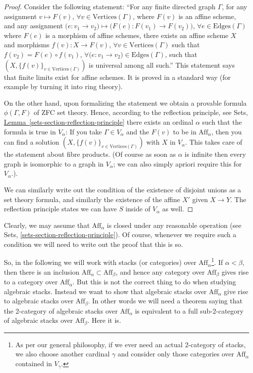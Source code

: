 \begin{proof}
Consider the following statement: ``For any finite directed graph $\Gamma$,
for any assignment $v \mapsto F(v)$, $\forall v\in \text{Vertices}(\Gamma)$,
where $F(v)$ is an affine scheme, and any assignment
$\big(e : v_1 \to v_2\big) \mapsto \big(F(e) : F(v_1) \to F(v_2)\big)$,
$\forall e \in \text{Edges}(\Gamma)$ where $F(e)$ is a morphism of affine
schemes, there exists an affine scheme $X$ and morphisms $f(v) : X \to F(v)$,
$\forall v\in \text{Vertices}(\Gamma)$ such that $f(v_2) = F(e) \circ f(v_1)$,
$\forall \big(e : v_1 \to v_2\big) \in \text{Edges}(\Gamma)$, such that
$(X, \{f(v)\}_{v\in \text{Vertices}(\Gamma)})$ is universal among all such.''
This statement says that finite limits exist for affine schemes. It is
proved in a standard way (for example by turning it into ring theory).

\smallskip\noindent
On the other hand, upon formalizing the statement we obtain a provable
formula $\phi(\Gamma, F)$ of ZFC set theory. Hence, according to the reflection
principle, see Sets, \hyperref[sets-section-reflection-principle]%
{Lemma~\ref*{sets-section-reflection-principle}}
there exists an ordinal $\alpha$ such that the formula is true in
$V_\alpha$: If you take $\Gamma \in V_\alpha$ and the $F(v)$ to be in
$\text{Aff}_\alpha$, then you can find a solution
$(X, \{f(v)\}_{v\in \text{Vertices}(\Gamma)})$
with $X$ in $V_\alpha$. This takes care of the statement about fibre 
products. (Of course as soon as $\alpha$ is infinite then every
graph is isomorphic to a graph in $V_\alpha$; we can also simply apriori
require this for $V_\alpha$.).

\smallskip\noindent
We can similarly write out the condition of the existence of disjoint unions
as a set theory formula, and similarly the existence of the affine $X'$
given $X \to Y$. The reflection principle states we can have $S$ inside of
$V_\alpha$ as well.
\end{proof}

\noindent
Clearly, we may assume that $\text{Aff}_\alpha$ is closed under any reasonable
operation (see Sets, \autoref{sets-section-reflection-principle}).
Of course, whenever we require such a condition we will need to write out
the proof that this is so.

\smallskip\noindent
So, in the following we will work with stacks (or categories) over
$\text{Aff}_\alpha$\footnote{As per our general philosophy, if we ever need
an actual 2-category of stacks, we also choose another cardinal $\gamma$ and
consider only those categories over $\text{Aff}_\alpha$ contained in
$V_\gamma$.}. If $\alpha < \beta$, then there is an inclusion
$\text{Aff}_\alpha \subset \text{Aff}_\beta$, and hence any category
over $\text{Aff}_\beta$ gives rise to a category over $\text{Aff}_\alpha$.
But this is not the correct thing to do when studying algebraic stacks.
Instead we want to show that algebraic stacks over $\text{Aff}_\alpha$
give rise to algebraic stacks over $\text{Aff}_\beta$. In other words we will
need a theorem saying that the 2-category of algebraic
stacks over $\text{Aff}_\alpha$ is equivalent to a full sub-2-category of
algebraic stacks over $\text{Aff}_\beta$. Here it is.

